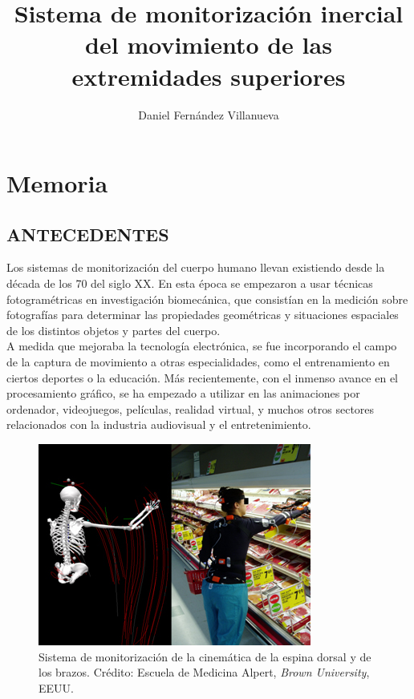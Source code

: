 \documentclass[12pt, a4paper]{report}
\author{Daniel Fernández Villanueva}
\title{\huge Sistema de monitorización inercial del movimiento de las extremidades superiores}
\begin{document}
\maketitle

\tableofcontents

\listoffigures

\listoftables


\part{Memoria}

\pagestyle{headings}



\chapter{ANTECEDENTES}

Los sistemas de monitorización del cuerpo humano llevan existiendo desde la década de los 70 del siglo XX. En esta época se empezaron a usar técnicas fotogramétricas en investigación biomecánica, que consistían en la medición sobre fotografías para determinar las propiedades geométricas y situaciones espaciales de los distintos objetos y partes del cuerpo.\\

A medida que mejoraba la tecnología electrónica, se fue incorporando el campo de la captura de movimiento a otras especialidades, como el entrenamiento en ciertos deportes o la educación. Más recientemente, con el inmenso avance en el procesamiento gráfico, se ha empezado a utilizar en las animaciones por ordenador, videojuegos, películas, realidad virtual, y muchos otros sectores relacionados con la industria audiovisual y el entretenimiento. \\

\begin{figure}
  \begin{center}
    \includegraphics[scale=0.6]{../img/UpperShopTracking.png} 
  \end{center}
  \caption[Sistema de monitorización de la cinemática de la espina dorsal y brazos]{Sistema de monitorización de la cinemática de la espina dorsal y de los brazos. Crédito: Escuela de Medicina Alpert, \textit{Brown University}, EEUU.}
\end{figure}
\end{document}
